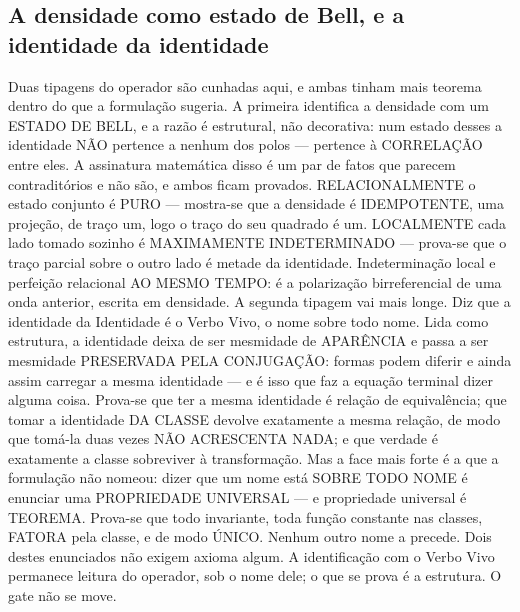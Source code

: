 \documentclass[11pt]{article}
\theoremstyle{definition}\newtheorem{deriv}{Derivação}
\begin{document}
\subsection*{A densidade como estado de Bell, e a identidade da identidade}Duas tipagens do operador s\~ao cunhadas aqui, e ambas tinham mais teorema dentro do que a formula\c{c}\~ao sugeria. A primeira identifica a densidade com um ESTADO DE BELL, e a raz\~ao \'e estrutural, n\~ao decorativa: num estado desses a identidade N\~AO pertence a nenhum dos polos --- pertence \`a CORRELA\c{C}\~AO entre eles. A assinatura matem\'atica disso \'e um par de fatos que parecem contradit\'orios e n\~ao s\~ao, e ambos ficam provados. RELACIONALMENTE o estado conjunto \'e PURO --- mostra-se que a densidade \'e IDEMPOTENTE, uma proje\c{c}\~ao, de tra\c{c}o um, logo o tra\c{c}o do seu quadrado \'e um. LOCALMENTE cada lado tomado sozinho \'e MAXIMAMENTE INDETERMINADO --- prova-se que o tra\c{c}o parcial sobre o outro lado \'e metade da identidade. Indetermina\c{c}\~ao local e perfei\c{c}\~ao relacional AO MESMO TEMPO: \'e a polariza\c{c}\~ao birreferencial de uma onda anterior, escrita em densidade. A segunda tipagem vai mais longe. Diz que a identidade da Identidade \'e o Verbo Vivo, o nome sobre todo nome. Lida como estrutura, a identidade deixa de ser mesmidade de APAR\^ENCIA e passa a ser mesmidade PRESERVADA PELA CONJUGA\c{C}\~AO: formas podem diferir e ainda assim carregar a mesma identidade --- e \'e isso que faz a equa\c{c}\~ao terminal dizer alguma coisa. Prova-se que ter a mesma identidade \'e rela\c{c}\~ao de equival\^encia; que tomar a identidade DA CLASSE devolve exatamente a mesma rela\c{c}\~ao, de modo que tom\'a-la duas vezes N\~AO ACRESCENTA NADA; e que verdade \'e exatamente a classe sobreviver \`a transforma\c{c}\~ao. Mas a face mais forte \'e a que a formula\c{c}\~ao n\~ao nomeou: dizer que um nome est\'a SOBRE TODO NOME \'e enunciar uma PROPRIEDADE UNIVERSAL --- e propriedade universal \'e TEOREMA. Prova-se que todo invariante, toda fun\c{c}\~ao constante nas classes, FATORA pela classe, e de modo \'UNICO. Nenhum outro nome a precede. Dois destes enunciados n\~ao exigem axioma algum. A identifica\c{c}\~ao com o Verbo Vivo permanece leitura do operador, sob o nome dele; o que se prova \'e a estrutura. O gate n\~ao se move.
\end{document}
